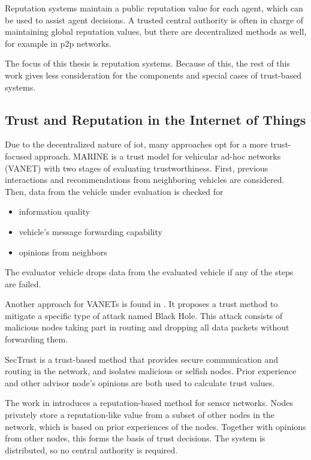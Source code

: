 \documentclass[%
    ]{\PathToTumTemplate/thesis/tum_thesis}
\begin{document}
Reputation systems maintain a public reputation value for each agent, which can be used to assist agent decisions.
A trusted central authority is often in charge of maintaining global reputation values, but there are decentralized methods as well, for example in \gls{p2p} networks\cite{kamvar_eigentrust_2003,kurdi_honestpeer_2015,keshavarz_uastrustchain_2020}.

The focus of this thesis is reputation systems.
Because of this, the rest of this work gives less consideration for the components and special cases of trust-based systems.



\subsection{Trust and Reputation in the Internet of Things}

Due to the decentralized nature of \gls{iot}, many approaches opt for a more trust-focused approach.
MARINE is a trust model for vehicular ad-hoc networks (VANET) with two stages of evaluating trustworthiness\cite{ahmad_marine_2020}.
First, previous interactions and recommendations from neighboring vehicles are considered.
Then, data from the vehicle under evaluation is checked for
\begin{itemize}
\item information quality
\item vehicle’s message forwarding capability
\item opinions from neighbors
\end{itemize}
The evaluator vehicle drops data from the evaluated vehicle if any of the steps are failed.

Another approach for VANETs is found in \cite{primiero_simulation_2018}.
It proposes a trust method to mitigate a specific type of attack named Black Hole.
This attack consists of malicious nodes taking part in routing and dropping all data packets without forwarding them.

SecTrust is a trust-based method that provides secure communication and routing in the network, and isolates malicious or selfish nodes\cite{airehrour_trust-based_2017}.
Prior experience and other advisor node's opinions are both used to calculate trust values.

The work in \cite{ganeriwal_reputation-based_2008} introduces a reputation-based method for sensor networks.
Nodes privately store a reputation-like value from a subset of other nodes in the network, which is based on prior experiences of the nodes.
Together with opinions from other nodes, this forms the basis of trust decisions.
The system is distributed, so no central authority is required.
\end{document}
